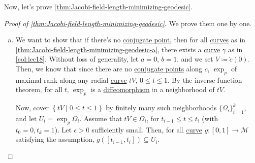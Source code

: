 Now, let's prove \autoref{thm:Jacobi-field-length-minimizing-geodesic}.
\begin{proof}[Proof of \autoref{thm:Jacobi-field-length-minimizing-geodesic}]
	We prove them one by one.
	\begin{enumerate}[(a)]
		\item We want to show that if there's no \hyperref[def:conjugate-point]{conjugate point}, then for all \hyperref[def:curve]{curves} as in \autoref{thm:Jacobi-field-length-minimizing-geodesic-a}, there exists a \hyperref[def:curve]{curve} \(\gamma \) as in \autoref{col:lec18}. Without loss of generality, let \(a = 0\), \(b = 1\), and we set \(V \coloneqq \dot{c} (0)\). Then, we know that since there are no \hyperref[def:conjugate-point]{conjugate points} along \(c\), \(\exp _p\) of maximal rank along any radial \hyperref[def:curve]{curve} \(t V\), \(0 \leq t \leq 1\). By the inverse function theorem, for all \(t\), \(\exp _p\) is a \hyperref[def:diffeomorphism]{diffeomorphism} in a neighborhood of \(tV\).

		      Now, cover \(\left\{ tV \mid 0 \leq t \leq 1 \right\} \) by finitely many such neighborhoods \(\{\Omega _i\}_{i=1}^k\), and let \(U_i = \exp _p \Omega _i\). Assume that \(tV\in \Omega _i\), for \(t_{i-1} \leq t \leq t_i\) (with \(t_0 = 0, t_k = 1\)). Let \(\epsilon > 0\) sufficiently small. Then, for all \hyperref[def:curve]{curve} \(g\colon [0, 1] \to \mathcal{M} \) satisfying the assumption, \(g([t_{i-1}, t_i]) \subseteq U_i\).


\end{enumerate}
\end{proof}
